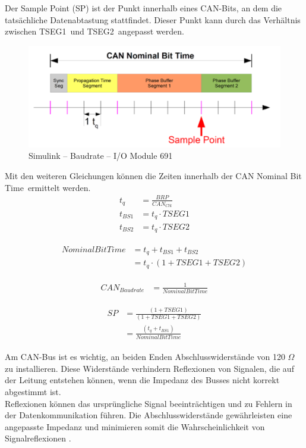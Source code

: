 Der Sample Point (SP) ist der Punkt innerhalb eines CAN-Bits, an dem die tatsächliche Datenabtastung stattfindet. Dieser Punkt kann durch das Verhältnis zwischen \frqq TSEG1\flqq\ und \frqq TSEG2\flqq\ angepasst werden.

\pagebreak[1]
\begin{figure}[!ht]
	\begin{center}
		\includegraphics[width=1\textwidth]{img/4_simulink/IO691_Baudrate.png}
		\caption{Simulink – Baudrate – I/O Module 691 \cite{speedgoat:IO691:CAN_Message}}
		\label{IO691_Konfigurieren:img:Baudrate}
	\end{center}
\end{figure}
\pagebreak[1]

Mit den weiteren Gleichungen können die Zeiten innerhalb der \frqq CAN Nominal Bit Time\flqq\ ermittelt werden.
\begin{align}
	\label{eq:tq}
	t_{q}   & = \frac{BRP}{CAN_{Clk}} \\
	t_{BS1} & = t_{q}  \cdot TSEG1    \\
	t_{BS2} & = t_{q}  \cdot TSEG2
\end{align}

\begin{align}
	\begin{split}
		NominalBitTime & = t_{q} + t_{BS1} + t_{BS2}        \\
		               & = t_{q}  \cdot (1 + TSEG1 + TSEG2)
	\end{split}
\end{align}

\begin{align}
	CAN_{Baudrate} & = \frac{1}{NominalBitTime}
\end{align}

\begin{align}
	\begin{split}
		SP & = \frac{(1 + TSEG1)}{(1 + TSEG1 + TSEG2)} \\
		   & = \frac{(t_q + t_{BS1})}{NominalBitTime}
	\end{split}
\end{align}

Am CAN-Bus ist es wichtig, an beiden Enden Abschlusswiderstände von 120 $\Omega$ zu installieren. Diese Widerstände verhindern Reflexionen von Signalen, die auf der Leitung entstehen können, wenn die Impedanz des Busses nicht korrekt abgestimmt ist.\\
Reflexionen können das ursprüngliche Signal beeinträchtigen und zu Fehlern in der Datenkommunikation führen. Die Abschlusswiderstände gewährleisten eine angepasste Impedanz und minimieren somit die Wahrscheinlichkeit von Signalreflexionen \cite{speedgoat:IO691:CAN_Message}.
